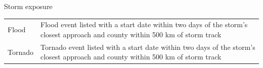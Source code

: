 \documentclass[ignorenonframetext,]{beamer}
\begin{document}
\begin{frame}{Storm exposure}
\begin{longtable}[]{@{}ll@{}}
\begin{minipage}[t]{0.24\columnwidth}
Flood\strut
\end{minipage} & \begin{minipage}[t]{0.65\columnwidth}\raggedright\strut
Flood event listed with a start date within two days of the storm's
closest approach and county within 500 km of storm track\strut
\end{minipage}\tabularnewline
\begin{minipage}[t]{0.24\columnwidth}\raggedright\strut
Tornado\strut
\end{minipage} & \begin{minipage}[t]{0.65\columnwidth}\raggedright\strut
Tornado event listed with a start date within two days of the storm's
closest approach and county within 500 km of storm track\strut
\end{minipage}\tabularnewline
\bottomrule
\end{longtable}

\end{frame}
\end{document}
